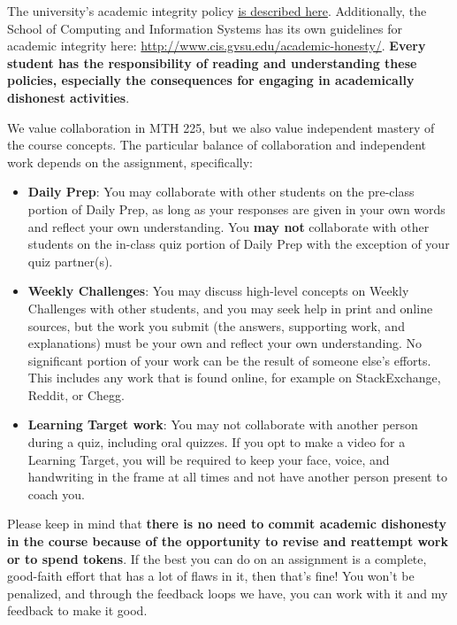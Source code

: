 \documentclass[]{article}
\providecommand{\tightlist}{%
  \setlength{\itemsep}{0pt}\setlength{\parskip}{0pt}}
\begin{document}
The university’s academic integrity policy \href{https://www.gvsu.edu/osccr/academic-misconduct-policies-and-procedures-14.htm}{is described  here}. Additionally, the School of Computing and Information Systems has its own guidelines for academic integrity here: \url{http://www.cis.gvsu.edu/academic-honesty/}. \textbf{Every student has the responsibility of reading and understanding these policies, especially the consequences for engaging in academically dishonest activities}.

We value collaboration in MTH 225, but we also value independent mastery of the course concepts. The particular balance of collaboration and independent work depends on the assignment, specifically: 

\begin{itemize}
\tightlist
    \item \textbf{Daily Prep}: You may collaborate with other students on the pre-class portion of Daily Prep, as long as your responses are given in your own words and reflect your own understanding. You \textbf{may not} collaborate with other students on the in-class quiz portion of Daily Prep with the exception of your quiz partner(s). 
    \item \textbf{Weekly Challenges}: You may discuss high-level concepts on Weekly Challenges with other students, and you may seek help in print and online sources, but the work you submit (the answers, supporting work, and explanations) must be your own and reflect your own understanding. No significant portion of your work can be the result of someone else's efforts. This includes any work that is found online, for example on StackExchange, Reddit, or Chegg. 
    \item \textbf{Learning Target work}: You may not collaborate with another person during a quiz, including oral quizzes. If you opt to make a video for a Learning Target, you will be required to keep your face, voice, and handwriting in the frame at all times and not have another person present to coach you. 
\end{itemize}

Please keep in mind that \textbf{there is no need to commit academic dishonesty in the course because of the opportunity to revise and reattempt work or to spend tokens}. If the best you can do on an assignment is a complete, good-faith effort that has a lot of flaws in it, then that's fine! You won't be penalized, and through the feedback loops we have, you can work with it and my feedback to make it good. 
\end{document}
